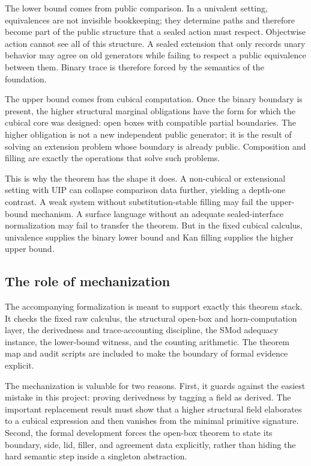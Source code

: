 \documentclass{lmcs}
\begin{document}
The lower bound comes from public comparison.  In a univalent setting, equivalences are not
invisible bookkeeping; they determine paths and therefore become part of the public structure
that a sealed action must respect.  Objectwise action cannot see all of this structure.  A
sealed extension that only records unary behavior may agree on old generators while failing to
respect a public equivalence between them.  Binary trace is therefore forced by the semantics
of the foundation.

The upper bound comes from cubical computation.  Once the binary boundary is present, the
higher structural marginal obligations have the form for which the cubical core was designed:
open boxes with compatible partial boundaries.  The higher obligation is not a new independent
public generator; it is the result of solving an extension problem whose boundary is already
public.  Composition and filling are exactly the operations that solve such problems.

This is why the theorem has the shape it does.  A non-cubical or extensional setting with UIP
can collapse comparison data further, yielding a depth-one contrast.  A weak system without
substitution-stable filling may fail the upper-bound mechanism.  A surface language without an
adequate sealed-interface normalization may fail to transfer the theorem.  But in the fixed
cubical calculus, univalence supplies the binary lower bound and Kan filling supplies the
higher upper bound.

\subsection{The role of mechanization}
\label{subsec:conclusion-mechanization}

The accompanying formalization is meant to support exactly this theorem stack.  It checks the
fixed raw calculus, the structural open-box and horn-computation layer, the derivedness and
trace-accounting discipline, the SMod adequacy instance, the lower-bound witness, and the
counting arithmetic.  The theorem map and audit scripts are included to make the boundary of
formal evidence explicit.

The mechanization is valuable for two reasons.  First, it guards against the easiest mistake in
this project: proving derivedness by tagging a field as derived.  The important replacement
result must show that a higher structural field elaborates to a cubical expression and then
vanishes from the minimal primitive signature.  Second, the formal development forces the
open-box theorem to state its boundary, side, lid, filler, and agreement data explicitly,
rather than hiding the hard semantic step inside a singleton abstraction.
\end{document}
